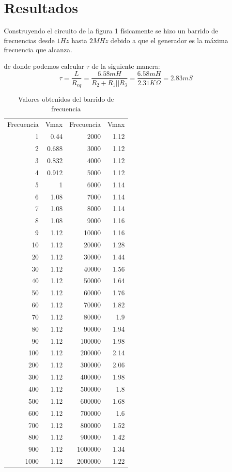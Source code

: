 \documentclass{report}
\newcounter{ns}
\begin{document}
\section{Resultados}

	Construyendo el circuito de la figura 1 físicamente se hizo un barrido de frecuencias desde $1Hz$ hasta $2MHz$ debido a que el generador es la máxima frecuencia que alcanza.
	
	de donde podemos calcular $\tau$ de la siguiente manera:
	\[\tau=\frac{L}{R_{eq}}=\frac{6.58mH}{R_2+R_1||R_3}=\frac{6.58mH}{2.31K\Omega}=2.83mS\]
	
\begin{table}[H]
	\centering
	\caption{Valores obtenidos del barrido de frecuencia}
	\begin{tabular}{r|r|r|r}
		\multicolumn{1}{l}{Frecuencia} & \multicolumn{1}{l}{Vmax} & \multicolumn{1}{l}{Frecuencia} & \multicolumn{1}{l}{Vmax} \\
		1     & 0.44  & 2000  & 1.12 \\
		2     & 0.688 & 3000  & 1.12 \\
		3     & 0.832 & 4000  & 1.12 \\
		4     & 0.912 & 5000  & 1.12 \\
		5     & 1     & 6000  & 1.14 \\
		6     & 1.08  & 7000  & 1.14 \\
		7     & 1.08  & 8000  & 1.14 \\
		8     & 1.08  & 9000  & 1.16 \\
		9     & 1.12  & 10000 & 1.16 \\
		10    & 1.12  & 20000 & 1.28 \\
		20    & 1.12  & 30000 & 1.44 \\
		30    & 1.12  & 40000 & 1.56 \\
		40    & 1.12  & 50000 & 1.64 \\
		50    & 1.12  & 60000 & 1.76 \\
		60    & 1.12  & 70000 & 1.82 \\
		70    & 1.12  & 80000 & 1.9 \\
		80    & 1.12  & 90000 & 1.94 \\
		90    & 1.12  & 100000 & 1.98 \\
		100   & 1.12  & 200000 & 2.14 \\
		200   & 1.12  & 300000 & 2.06 \\
		300   & 1.12  & 400000 & 1.98 \\
		400   & 1.12  & 500000 & 1.8 \\
		500   & 1.12  & 600000 & 1.68 \\
		600   & 1.12  & 700000 & 1.6 \\
		700   & 1.12  & 800000 & 1.52 \\
		800   & 1.12  & 900000 & 1.42 \\
		900   & 1.12  & 1000000 & 1.34 \\
		1000  & 1.12  & 2000000 & 1.22 \\
	\end{tabular}%
	\label{tab:addlabel}%
\end{table}%
	
\end{document}

